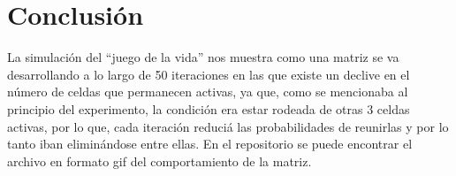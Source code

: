 \documentclass{article}
\begin{document}
\newpage

\section{Conclusi\'on}

La simulaci\'on del ``juego de la vida'' nos muestra como una matriz se va desarrollando a lo largo de 50 iteraciones en las que existe un declive en el n\'umero de celdas que permanecen activas, ya que, como se mencionaba al principio del experimento, la condici\'on era estar rodeada de otras 3 celdas activas, por lo que, cada iteraci\'on reduci\'a las probabilidades de reunirlas y por lo tanto iban elimin\'andose entre ellas.
En el repositorio\cite{yo} se puede encontrar el archivo en formato gif del comportamiento de la matriz.



\end{document}
